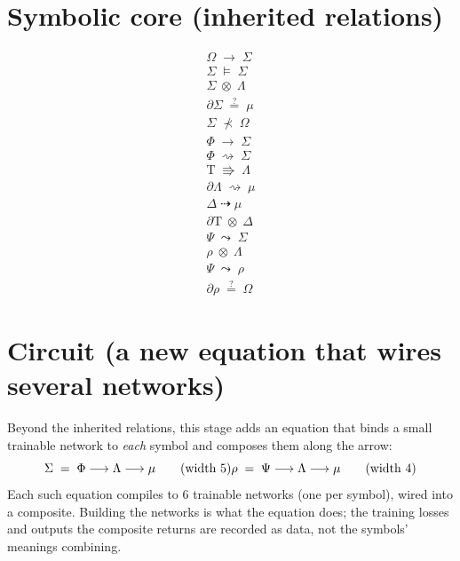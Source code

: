 \documentclass[11pt]{article}
\newcommand{\Tau}{\mathrm{T}}
\begin{document}
\section*{Symbolic core (inherited relations)}\begin{align*}
\Omega \; \longrightarrow \; \Sigma \\[3pt] \Sigma \; \models \; \Sigma \\[3pt] \Sigma \; \otimes \; \Lambda \\[3pt] \partial \Sigma \; \stackrel{?}{=} \; \mu \\[3pt] \Sigma \; \nprec \; \Omega \\[3pt] \Phi \; \longrightarrow \; \Sigma \\[3pt] \Phi \; \rightsquigarrow \; \Sigma \\[3pt] \Tau \; \Rrightarrow \; \Lambda \\[3pt] \partial \Lambda \; \rightsquigarrow \; \mu \\[3pt] \Delta \; \dashrightarrow \; \mu \\[3pt] \partial \Tau \; \otimes \; \Delta \\[3pt] \Psi \; \leadsto \; \Sigma \\[3pt] \rho \; \otimes \; \Lambda \\[3pt] \Psi \; \leadsto \; \rho \\[3pt] \partial \rho \; \stackrel{?}{=} \; \Omega
\end{align*}
\section*{Circuit (a new equation that wires several networks)}Beyond the inherited relations, this stage adds an equation that binds a small trainable network to \emph{each} symbol and composes them along the arrow:\begin{equation*}\Sigma \;=\; \Phi \longrightarrow \Lambda \longrightarrow \mu \qquad (\text{width } 5)\\[4pt] \rho \;=\; \Psi \longrightarrow \Lambda \longrightarrow \mu \qquad (\text{width } 4)\end{equation*}Each such equation compiles to 6 trainable networks (one per symbol), wired into a composite. Building the networks is what the equation does; the training losses and outputs the composite returns are recorded as data, not the symbols' meanings combining.
\end{document}
